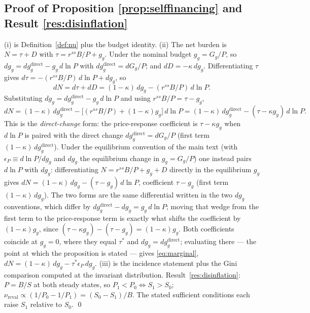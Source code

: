 \documentclass[12pt]{article}
\newcommand{\Sfun}{S}
\begin{document}
\subsection{Proof of Proposition \ref{prop:selffinancing} and
Result \ref{res:disinflation}}
(i) is Definition~\ref{def:nu} plus the budget identity. (ii) The net burden
is $N=\tau+D$ with $\tau=r^{ss}B/P+g_g$. Under the nominal budget $g_g=G_g/P$,
so $dg_g = dg_g^{\mathrm{direct}} - g_g\,d\ln P$ with
$dg_g^{\mathrm{direct}}=dG_g/P$; and $dD=-\kappa\,dg_g$. Differentiating
$\tau$ gives $d\tau = -(r^{ss}B/P)\,d\ln P + dg_g$, so
\[
dN = d\tau + dD = (1-\kappa)\,dg_g - (r^{ss}B/P)\,d\ln P.
\]
Substituting $dg_g = dg_g^{\mathrm{direct}} - g_g\,d\ln P$ and using
$r^{ss}B/P = \tau - g_g$,
\[
dN = (1-\kappa)\,dg_g^{\mathrm{direct}}
   - \big[(r^{ss}B/P)+(1-\kappa)g_g\big]\,d\ln P
   = (1-\kappa)\,dg_g^{\mathrm{direct}} - (\tau-\kappa g_g)\,d\ln P .
\]
This is the \emph{direct-change} form: the price-response coefficient is
$\tau-\kappa g_g$ when $d\ln P$ is paired with the direct change
$dg_g^{\mathrm{direct}}=dG_g/P$ (first term $(1-\kappa)\,dg_g^{\mathrm{direct}}$).
Under the equilibrium convention of the main text (with $\epsilon_P\equiv d\ln
P/dg_g$ and $dg_g$ the equilibrium change in $g_g=G_g/P$) one instead pairs
$d\ln P$ with $dg_g$: differentiating $N=r^{ss}B/P+g_g+D$ directly in the
equilibrium $g_g$ gives $dN=(1-\kappa)\,dg_g-(\tau-g_g)\,d\ln P$, coefficient
$\tau-g_g$ (first term $(1-\kappa)\,dg_g$). The two forms are the same
differential written in the two $dg_g$ conventions, which differ by
$dg_g^{\mathrm{direct}}-dg_g=g_g\,d\ln P$; moving that wedge from the first term
to the price-response term is exactly what shifts the coefficient by
$(1-\kappa)g_g$, since $(\tau-\kappa g_g)-(\tau-g_g)=(1-\kappa)g_g$. Both
coefficients coincide at $g_g=0$, where they equal $\tau^{*}$ and
$dg_g=dg_g^{\mathrm{direct}}$; evaluating there --- the point at which the
proposition is stated --- gives \eqref{eq:marginal},
$dN=(1-\kappa)\,dg_g-\tau^{*}\epsilon_P\,dg_g$.
(iii) is the incidence statement plus the Gini comparison computed at the
invariant distribution. Result~\ref{res:disinflation}: $P=B/\Sfun$ at both
steady states, so $P_1<P_0 \iff \Sfun_1>\Sfun_0$;
$\nu_{\mathrm{reval}}\propto(1/P_0-1/P_1)=(\Sfun_0-\Sfun_1)/B$. The stated
sufficient conditions each raise $\Sfun_1$ relative to $\Sfun_0$. \qed
\end{document}
